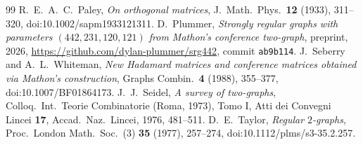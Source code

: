 \documentclass[11pt]{amsart}
\theoremstyle{definition}
\theoremstyle{remark}
\newcommand{\code}[1]{\texttt{#1}}
\begin{document}
\begin{thebibliography}{99}
 R.~E.~A.~C.~Paley, \emph{On orthogonal matrices}, J.\ Math.\ Phys.\ \textbf{12} (1933), 311--320, doi:10.1002/sapm1933121311.
 D.~Plummer, \emph{Strongly regular graphs with parameters $(442,231,120,121)$ from Mathon's
conference two-graph}, preprint, 2026, \url{https://github.com/dylan-plummer/srg442}, commit \code{ab9b114}.
 J.~Seberry and A.~L.~Whiteman, \emph{New Hadamard matrices and conference matrices obtained
via Mathon's construction}, Graphs Combin.\ \textbf{4} (1988), 355--377, doi:10.1007/BF01864173.
 J.~J.~Seidel, \emph{A survey of two-graphs}, Colloq.\ Int.\ Teorie Combinatorie (Roma, 1973), Tomo I,
Atti dei Convegni Lincei \textbf{17}, Accad.\ Naz.\ Lincei, 1976, 481--511.
 D.~E.~Taylor, \emph{Regular $2$-graphs}, Proc.\ London Math.\ Soc.\ (3) \textbf{35} (1977), 257--274,
doi:10.1112/plms/s3-35.2.257.
\end{thebibliography}
\end{document}

